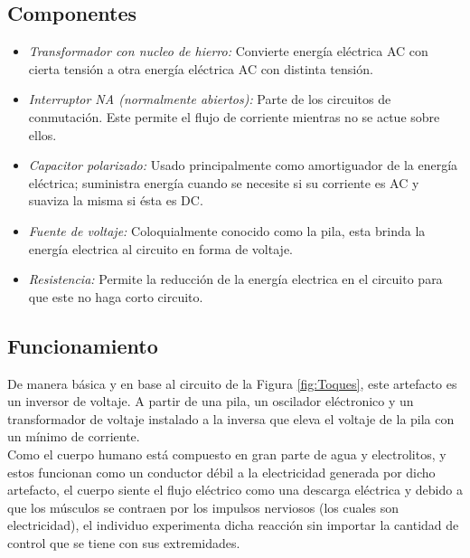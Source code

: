 \documentclass[letterpaper, 12pt]{article}
\begin{document}
\begin{justify}
        \subsection{Componentes}
        \begin{itemize}
            \item \emph{Transformador con nucleo de hierro:}  Convierte energía eléctrica AC con cierta tensión a otra energía eléctrica AC con distinta tensión. 
            \item \emph{Interruptor NA (normalmente abiertos):} Parte de los circuitos de conmutación. Este permite el flujo de corriente mientras no se actue sobre ellos.
            \item \emph{Capacitor polarizado:} Usado principalmente como amortiguador de la energía eléctrica; suministra energía cuando se necesite si su corriente es AC y suaviza la misma si ésta es DC.
            \item \emph{Fuente de voltaje:} Coloquialmente conocido como la pila, esta brinda la energía electrica al circuito en forma de voltaje.
            \item \emph{Resistencia:} Permite la reducción de la energía electrica en el circuito para que este no haga corto circuito.
        \end{itemize}
        \subsection{Funcionamiento}
        \justify
        De manera básica y en base al circuito de la Figura \ref{fig:Toques}, este artefacto es un inversor de voltaje. A partir de una pila, un oscilador eléctronico y un transformador de voltaje instalado a la inversa que eleva el voltaje de la pila con un
        mínimo de corriente. \\ \newline
        Como el cuerpo humano está compuesto en gran parte de agua y electrolitos, y estos funcionan como un conductor débil a la electricidad generada por dicho artefacto, el cuerpo siente el flujo eléctrico como
        una descarga eléctrica y debido a que los músculos se contraen por los impulsos nerviosos (los cuales son electricidad), el individuo experimenta dicha reacción sin importar la cantidad de control que se tiene con sus extremidades. 

\end{justify}
\end{document}
